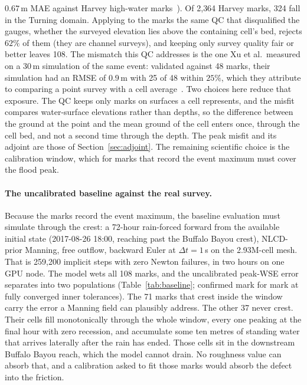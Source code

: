 \documentclass[11pt]{article}
\begin{document}
$0.67$\,m MAE against Harvey high-water marks~\cite{li2026inunda}).
Of 2{,}364 Harvey marks, 324 fall in the Turning domain. Applying to
the marks the same QC that disqualified the gauges, whether the
surveyed elevation lies above the containing cell's bed, rejects
$62\%$ of them (they are channel surveys), and keeping only survey
quality fair or better leaves 108. The mismatch this QC addresses is the one Xu et al.\ measured on
a 30\,m simulation of the same event: validated against 48 marks, their
simulation had an RMSE of $0.9$\,m with 25 of 48 within $25\%$, which they
attribute to comparing a point survey with a cell average~\cite{xu2025harvey}.
Two choices here reduce that exposure. The QC keeps only marks on surfaces
a cell represents, and the misfit compares water-surface elevations rather
than depths, so the difference between the ground at the point and the
mean ground of the cell enters once, through the cell bed, and not a
second time through the depth. The peak misfit and its adjoint are
those of Section~\ref{sec:adjoint}. The remaining scientific choice
is the calibration window, which for marks that record the event
maximum must cover the flood peak.

\paragraph{The uncalibrated baseline against the real survey.}
Because the marks record the event maximum, the baseline evaluation
must simulate through the crest: a 72-hour rain-forced forward from
the available initial state (2017-08-26 18:00, reaching past the
Buffalo Bayou crest), NLCD-prior Manning, free outflow, backward Euler
at $\Delta t = 1$\,s on the 2.93M-cell mesh. That is 259{,}200
implicit steps with zero Newton failures, in two hours on one GPU
node. The model wets all 108 marks, and the uncalibrated peak-WSE
error separates into two populations (Table~\ref{tab:baseline};
confirmed mark for mark at fully converged inner tolerances). The 71
marks that crest inside the window carry the error a Manning field
can plausibly address. The other 37 never crest. Their cells fill
monotonically through the whole window, every one peaking at the
final hour with zero recession, and accumulate some ten metres of
standing water that arrives laterally after the rain has ended. Those
cells sit in the downstream Buffalo Bayou reach, which the model
cannot drain. No roughness value can absorb that, and a calibration
asked to fit those marks would absorb the defect into the friction.
\end{document}
